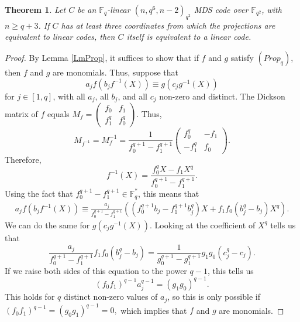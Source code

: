 \documentclass[10pt,a4paper]{amsart}
\newtheorem{thm}{Theorem}
\newcommand{\FF}{\mathbb F}
\begin{document}
\begin{thm}
 Let $C$ be an $\FF_q$-linear $(n,q^6,n-2)_{q^2}$ MDS code over $\FF_{q^2}$, with $n \geq q + 3$.
 If $C$ has at least three coordinates from which the projections are equivalent to linear codes, then $C$ itself is equivalent to a linear code.
\end{thm}

\begin{proof}
By Lemma \ref{LmProp}, it suffices to show that if $f$ and $g$ satisfy $(Prop_q)$, then $f$ and $g$ are monomials.
Thus, suppose that
\[
 a_j f(b_j f^{-1} (X)) \equiv g(c_j g^{-1}(X))
\]
for $j \in [1,q]$, with all $a_j$, all $b_j$, and all $c_j$ non-zero and distinct.
The Dickson matrix of $f$ equals
\(
 M_f = \begin{pmatrix}
  f_0 & f_1 \\ f_1^q & f_0^q
 \end{pmatrix}
\).
Thus,
\[
 M_{f^{-1}} = M_f^{-1} = \frac 1 {f_0^{q+1}-f_1^{q+1}} \begin{pmatrix}
 f_0^q & -f_1 \\ -f_1^q & f_0
 \end{pmatrix}.
\]
Therefore,
\[
 f^{-1}(X) = \frac{f_0^q X - f_1 X^q}{f_0^{q+1}-f_1^{q+1}}.
\]
Using the fact that 
\(
 f_0^{q+1} - f_1^{q+1} \in \FF_q^*
\), this means that
\begin{align}
 a_j f(b_j f^{-1}(X))
 \equiv \frac{a_j}{f_0^{q+1} - f_1^{q+1}} \left( (f_0^{q+1} b_j - f_1^{q+1} b_j^q) X + f_1 f_0 (b_j^q-b_j) X^q \right).
\end{align}
We can do the same for $g(c_j g^{-1} (X))$.
Looking at the coefficient of $X^q$ tells us that
\[
 \frac{a_j}{f_0^{q+1} - f_1^{q+1}} f_1 f_0 (b_j^q - b_j)
 = \frac 1 {g_0^{q+1} - g_1^{q+1}} g_1 g_0 (c_j^q - c_j).
\]
If we raise both sides of this equation to the power $q-1$, this tells us
\[
 (f_0 f_1)^{q-1} a_j^{q-1} = (g_1 g_0)^{q-1}.
\]
This holds for $q$ distinct non-zero values of $a_j$, so this is only possible if
\(
 (f_0 f_1)^{q-1} = (g_0 g_1)^{q-1} = 0,
\)
which implies that $f$ and $g$ are monomials.
\end{proof}
\end{document}
